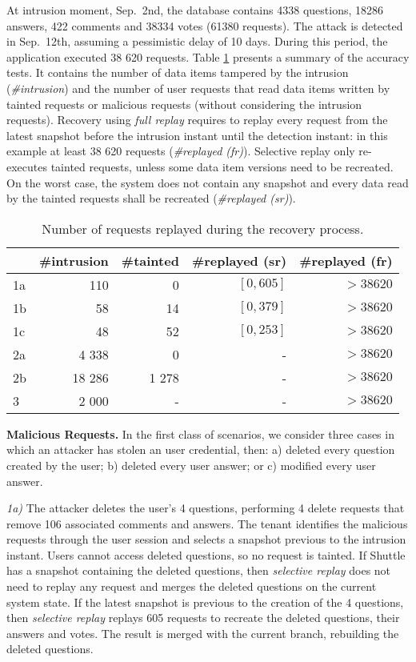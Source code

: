 At intrusion moment, Sep.~2nd, the database contains 4338 questions, 18286 answers, 422 comments and 38334 votes (61380 requests). The attack is detected in Sep.~12th, assuming a pessimistic delay of 10 days. During this period, the application executed 38 620 requests. Table \ref{tab:accuracy} presents a summary of the accuracy tests. It contains the number of data items tampered by the intrusion (\emph{\#intrusion}) and the number of user requests that read data items written by  tainted requests or malicious requests (without considering the intrusion requests). Recovery using \textit{full replay} requires to replay every request from the latest snapshot before the intrusion instant until the detection instant: in this example at least 38 620 requests (\emph{\#replayed (fr)}). Selective replay only re-executes tainted requests, unless some data item versions need to be recreated. On the worst case, the system does not contain any snapshot and every data read by the tainted requests shall be recreated (\emph{\#replayed (sr)}). 

\begin{table}
\footnotesize
\begin{tabular}{l|rrrr}
    & \#intrusion & \#tainted & \#replayed (sr)     & \#replayed (fr) \\ \hline
1a       & 110          & 0          & $[0, 605]$   & $> 38 620$  \\
1b       & 58           & 14         & $[0, 379]$   & $> 38 620$  \\
1c       & 48           & 52         & $[0, 253]$   & $> 38 620$  \\
2a       & 4 338        & 0          &  -           & $> 38 620$  \\
2b       & 18 286       & 1 278      &  -           & $> 38 620$  \\
3        & 2 000        & -          &  -           & $> 38 620$  \\
\end{tabular}
  \caption{Number of requests replayed during the recovery process.}
  \label{tab:accuracy}
\end{table}

\textbf{Malicious Requests.} 
 In the first class of scenarios, we consider three cases in which an attacker has stolen an user credential, then: a) deleted every question created by the user; b) deleted every user answer; or c) modified every user answer.

\textit{1a)} The attacker deletes the user's 4 questions, performing 4 delete requests that remove 106 associated comments and answers. The tenant identifies the malicious requests through the user session and selects a snapshot previous to the intrusion instant. Users cannot access deleted questions, so no request is tainted. If Shuttle has a snapshot containing the deleted questions, then \textit{selective replay} does not need to replay any request and merges the deleted questions on the current system state. If the latest snapshot is previous to the creation of the 4 questions, then \textit{selective replay} replays 605 requests to recreate the deleted questions, their answers and votes. The result is merged with the current branch, rebuilding the deleted questions. 

